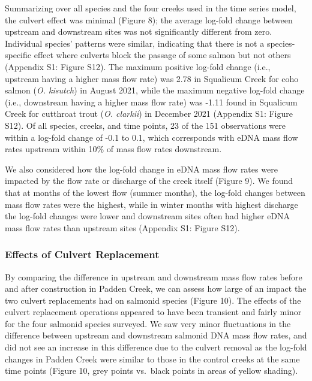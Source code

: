 \documentclass[
]{article}
\begin{document}
Summarizing over all species and the four creeks used in the time series
model, the culvert effect was minimal (Figure 8); the average log-fold
change between upstream and downstream sites was not significantly
different from zero. Individual species' patterns were similar,
indicating that there is not a species-specific effect where culverts
block the passage of some salmon but not others (Appendix S1: Figure
S12). The maximum positive log-fold change (i.e., upstream having a
higher mass flow rate) was 2.78 in Squalicum Creek for coho salmon
(\emph{O. kisutch}) in August 2021, while the maximum negative log-fold
change (i.e., downstream having a higher mass flow rate) was -1.11 found
in Squalicum Creek for cutthroat trout (\emph{O. clarkii}) in December
2021 (Appendix S1: Figure S12). Of all species, creeks, and time points,
23 of the 151 observations were within a log-fold change of -0.1 to 0.1,
which corresponds with eDNA mass flow rates upstream within 10\% of mass
flow rates downstream.

We also considered how the log-fold change in eDNA mass flow rates were
impacted by the flow rate or discharge of the creek itself (Figure 9).
We found that at months of the lowest flow (summer months), the log-fold
changes between mass flow rates were the highest, while in winter months
with highest discharge the log-fold changes were lower and downstream
sites often had higher eDNA mass flow rates than upstream sites
(Appendix S1: Figure S12).

\hypertarget{effects-of-culvert-replacement}{%
\subsubsection{Effects of Culvert
Replacement}\label{effects-of-culvert-replacement}}

By comparing the difference in upstream and downstream mass flow rates
before and after construction in Padden Creek, we can assess how large
of an impact the two culvert replacements had on salmonid species
(Figure 10). The effects of the culvert replacement operations appeared
to have been transient and fairly minor for the four salmonid species
surveyed. We saw very minor fluctuations in the difference between
upstream and downstream salmonid DNA mass flow rates, and did not see an
increase in this difference due to the culvert removal as the log-fold
changes in Padden Creek were similar to those in the control creeks at
the same time points (Figure 10, grey points vs.~black points in areas
of yellow shading).
\end{document}

